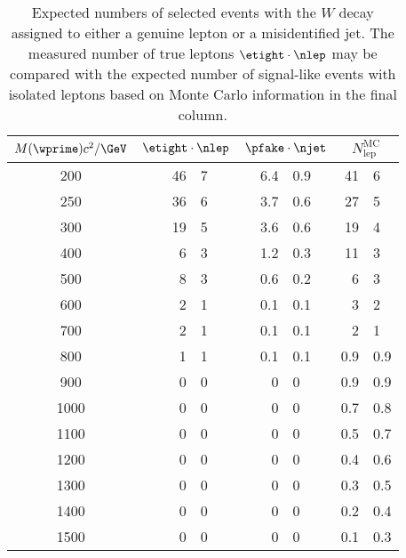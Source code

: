 \begin{table}
  \centering 
  \begin{tabular}{ c r@{$\pm$}l r@{$\pm$}l r@{$\pm$}l }
    \toprule
    $M(\wprime)c^2/\GeV$ & \multicolumn{2}{c}{$\etight\cdot\nlep$} & \multicolumn{2}{c}{$\pfake\cdot\njet$} & \multicolumn{2}{c}{$N_\text{lep}^\text{MC}$} \\
    \midrule
    \phantom{0}200 & \phantom{00}46 & 7 & 6.4 & 0.9 & 41 & 6 \\
    \phantom{0}250 & 36 & 6 & 3.7 & 0.6 &  27 & 5 \\
    \phantom{0}300 & 19 & 5 & 3.6 & 0.6 &  19 & 4 \\
    \phantom{0}400 & 6 & 3 & 1.2 & 0.3 &  11 & 3 \\
    \phantom{0}500 & 8 & 3 & 0.6 & 0.2 &  6 & 3 \\
    \phantom{0}600 & 2 & 1 & 0.1 & 0.1 & 3 & 2 \\
    \phantom{0}700 & 2 & 1 & 0.1 & 0.1 & 2 & 1 \\
    \phantom{0}800 & 1 & 1 & 0.1 & 0.1 & 0.9 & 0.9 \\
    \phantom{0}900 & 0 & 0 & 0 & 0 & 0.9 & 0.9 \\
              1000 & 0 & 0 & 0 & 0 &  0.7 & 0.8 \\
              1100 & 0 & 0 & 0 & 0 &  0.5 & 0.7 \\
              1200 & 0 & 0 & 0 & 0 &  0.4 & 0.6 \\
              1300 & 0 & 0 & 0 & 0 &  0.3 & 0.5 \\
              1400 & 0 & 0 & 0 & 0 &  0.2 & 0.4 \\
              1500 & 0 & 0 & 0 & 0 & 0.1 & 0.3 \\
    \bottomrule
  \end{tabular}
  \caption[Results of the matrix method for background estimation]{Expected numbers of selected events with the $W$ decay assigned to either a genuine lepton or a misidentified jet.  The measured number of true leptons $\etight\cdot\nlep$ may be compared with the expected number of signal-like events with isolated leptons based on Monte Carlo information in the final column.}
  \label{tab:matrix-results}
\end{table}

